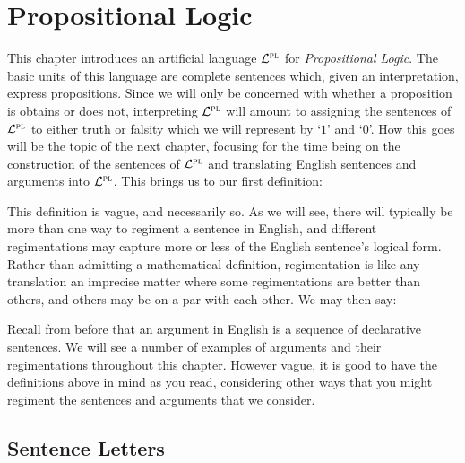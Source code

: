 \chapter{Propositional Logic}
  \label{ch.PL-syntax}


This chapter introduces an artificial language $\mathcal{L}^{\textsc{pl}}$ for \textit{Propositional Logic}.
The basic units of this language are complete sentences which, given an interpretation, express propositions.
Since we will only be concerned with whether a proposition is obtains or does not, interpreting $\mathcal{L}^{\textsc{pl}}$ will amount to assigning the sentences of $\mathcal{L}^{\textsc{pl}}$ to either truth or falsity which we will represent by `$1$' and `$0$'.
How this goes will be the topic of the next chapter, focusing for the time being on the construction of the sentences of $\mathcal{L}^{\textsc{pl}}$ and translating English sentences and arguments into $\mathcal{L}^{\textsc{pl}}$.
This brings us to our first definition: 
  

This definition is vague, and necessarily so.
As we will see, there will typically be more than one way to regiment a sentence in English, and different regimentations may capture more or less of the English sentence's logical form.
Rather than admitting a mathematical definition, regimentation is like any translation an imprecise matter where some regimentations are better than others, and others may be on a par with each other.
We may then say:


Recall from before that an argument in English is a sequence of declarative sentences.
We will see a number of examples of arguments and their regimentations throughout this chapter.
However vague, it is good to have the definitions above in mind as you read, considering other ways that you might regiment the sentences and arguments that we consider.




\section{Sentence Letters}

